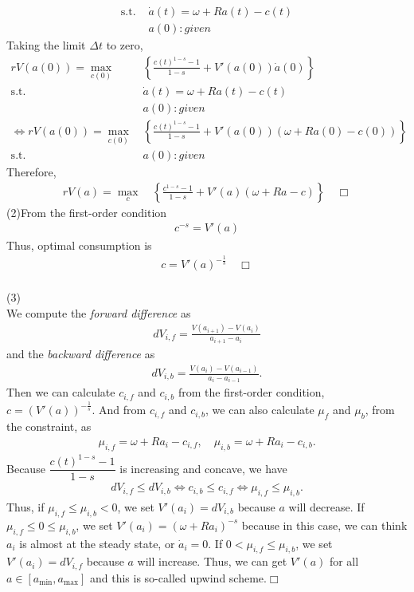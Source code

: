 \documentclass{article}
\begin{document}
\begin{CJK}{UTF8}{min}
\begin{align*}
\mathrm{s.t.} \,\,&\dot a(t)=\omega+Ra(t)-c(t)\\
&a(0):given
\end{align*}
Taking the limit $\Delta t$ to zero,
\begin{align*}
rV(a(0))=\max_{c(0)} \, &\left\{\frac{c(t)^{1-s}-1}{1-s}+V'(a(0))\dot a(0)\right\}\\
\mathrm{s.t.} \,\,&\dot a(t)=\omega+Ra(t)-c(t)\\
&a(0):given\\
\Leftrightarrow rV(a(0))=\max_{c(0)} \, &\left\{\frac{c(t)^{1-s}-1}{1-s}+V'(a(0))(\omega+Ra(0)-c(0))\right\}\\
\mathrm{s.t.} \,\,&a(0):given
\end{align*}
Therefore,
\begin{align*}
rV(a)=\max_c \, &\left\{\frac{c^{1-s}-1}{1-s}+V'(a)(\omega+Ra-c)\right\}\quad\Box
\end{align*}
(2)\quad From the first-order condition
\begin{align*}
c^{-s}=V'(a)
\end{align*}
Thus, optimal consumption is
\begin{align*}
c=V'(a)^{-\frac1s}\quad \Box
\end{align*}\\
(3)\\
We compute the \emph{forward difference} as
\begin{align*}
dV_{i,f}=\frac{V(a_{i+1})-V(a_i)}{a_{i+1}-a_i}
\end{align*}
and the \emph{backward difference} as
\begin{align*}
dV_{i,b}=\frac{V(a_{i})-V(a_{i-1})}{a_{i}-a_{i-1}}.
\end{align*}
Then we can calculate $c_{i,f}$ and $c_{i,b}$ from the first-order condition, $c=(V'(a))^{-\frac1s}$. And from $c_{i,f}$ and $c_{i,b}$, we can also calculate $\mu_f$ and $\mu_b$, from the constraint, as
\begin{align*}
\mu_{i,f}=\omega+Ra_i-c_{i,f},\quad
\mu_{i,b}=\omega+Ra_i-c_{i,b}.
\end{align*}
Because $\dfrac{c(t)^{1-s}-1}{1-s}$ is increasing and concave, we have 
\begin{align*}
dV_{i,f}\leq dV_{i,b}\Leftrightarrow c_{i,b}\leq c_{i,f}\Leftrightarrow\mu_{i,f}\leq\mu_{i,b}.
\end{align*}
 Thus, if $\mu_{i,f}\leq\mu_{i,b}<0$, we set $V'(a_i)=dV_{i,b}$ because $a$ will decrease. If $\mu_{i,f}\leq0\leq\mu_{i,b}$, we set
 $V'(a_i)=(\omega+Ra_i)^{-s}$ because in this case, we can think $a_i$ is almost at the steady state, or $\dot a_i=0$. If $0<\mu_{i,f}\leq\mu_{i,b}$, we set $V'(a_i)=dV_{i,f}$ because $a$ will increase. Thus, we can get $V'(a)$ for all $a\in[a_{\min},a_{\max}]$ and this is so-called upwind scheme.\quad$\Box $

\end{CJK}
\end{document}
